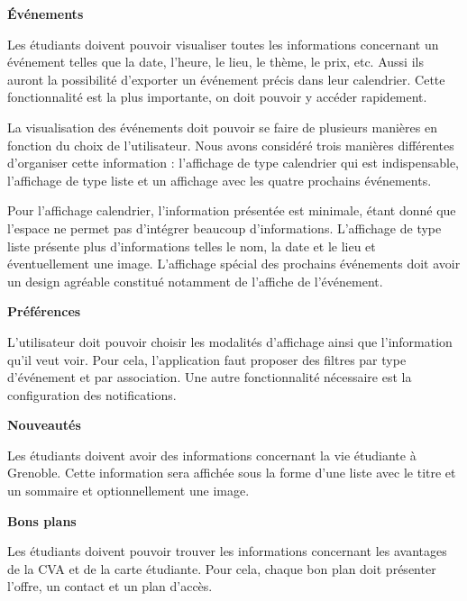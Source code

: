 \documentclass[a4paper, 11px]{article}
\begin{document}
\vspace{.3cm}

 \textbf {\large Événements}

Les étudiants doivent pouvoir visualiser toutes les informations concernant un événement telles que la date, l'heure, le lieu, le thème, le prix, etc. Aussi ils auront la possibilité d'exporter un événement précis dans leur calendrier. Cette fonctionnalité est la plus importante, on doit pouvoir y accéder rapidement. 

La visualisation des événements doit pouvoir se faire de plusieurs manières en fonction du choix de l'utilisateur. Nous avons considéré trois manières différentes d'organiser cette information : l'affichage de type calendrier qui est indispensable, l'affichage de type liste et un affichage avec les quatre prochains événements.

Pour l'affichage calendrier, l'information présentée est minimale, étant donné que l'espace ne permet pas d'intégrer beaucoup d'informations. L'affichage de type liste présente plus d'informations telles le nom, la date et le lieu et éventuellement une image. L'affichage spécial des prochains événements doit avoir un design agréable constitué notamment de l'affiche de l'événement.

\vspace{.3cm}

 \textbf {\large Préférences}

L'utilisateur doit pouvoir choisir les modalités d'affichage ainsi que l'information qu'il veut voir. Pour cela, l'application faut proposer des filtres par type d'événement et par association. Une autre fonctionnalité nécessaire est la configuration des notifications.

\vspace{.3cm}

 \textbf {\large Nouveautés}

Les étudiants doivent avoir des informations concernant la vie étudiante à Grenoble. Cette information sera affichée sous la forme d'une liste avec le titre et un sommaire et optionnellement une image.

\vspace{.3cm}

 \textbf {\large Bons plans}

Les étudiants doivent pouvoir trouver les informations concernant les avantages de la CVA et de la carte étudiante. Pour cela, chaque bon plan doit présenter l'offre, un contact et un plan d'accès.
\end{document}
